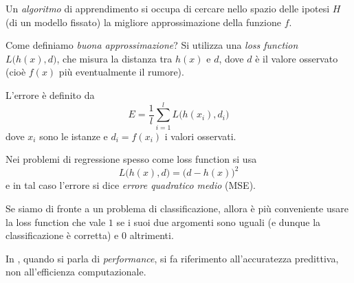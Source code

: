 \begin{definition}
Un \emph{algoritmo} di apprendimento si occupa di cercare nello spazio delle ipotesi $H$ (di un modello fissato) la migliore approssimazione della funzione $f$.
\end{definition}

Come definiamo \emph{buona approssimazione}? Si utilizza una \emph{loss function} $L\big(h(x),d\big)$, che misura la distanza tra $h(x)$ e $d$, dove $d$ è il valore osservato (cioè $f(x)$ più eventualmente il rumore).

\begin{definition}[Errore]
L'errore è definito da
\begin{equation}
E=\frac 1l\sum_{i=1}^{l}L\big(h(x_i),d_i\big)
\end{equation}
dove $x_i$ sono le istanze e $d_i=f(x_i)$ i valori osservati.
\end{definition}

\begin{example}
Nei problemi di regressione spesso come loss function si usa \begin{equation}
L\big(h(x),d\big)=\big(d-h(x)\big)^2
\end{equation}
e in tal caso l'errore si dice \emph{errore quadratico medio} (MSE).

Se siamo di fronte a un problema di classificazione, allora è più conveniente usare la loss function che vale $1$ se i suoi due argomenti sono uguali (e dunque la classificazione è corretta) e $0$ altrimenti.
\end{example}

\begin{remark}
In \ml, quando si parla di \emph{performance}, si fa riferimento all'accuratezza predittiva, non all'efficienza computazionale.
\end{remark}